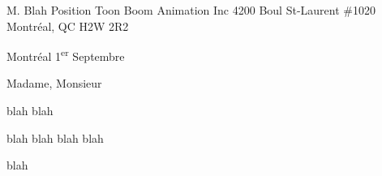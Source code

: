 \insertcvheader

\clrecipient
	{M. Blah}
	{Position}
	{Toon Boom Animation Inc}
	{4200 Boul St-Laurent \#1020}
	{Montréal, QC H2W 2R2}
	
\cllocationdate
	{Montréal}
	{1\textsuperscript{er} Septembre}
	
\clgreeting
	{Madame, Monsieur}
	
blah blah

blah blah blah blah

blah

